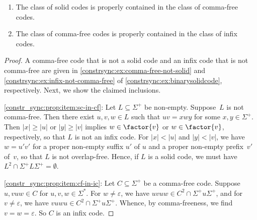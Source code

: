 \begin{proposition}
	\label{constr_sync:prop:selfsync_implies_avoiding}
	\begin{enumerate} 
		\item \label{constr_sync:prop:item:sc-in-cf} The class of solid codes is properly contained in the 
		class of comma-free codes. 
		
		\item \label{constr_sync:prop:item:cf-in-ic} The class of comma-free codes is properly contained in the class of infix codes.
	\end{enumerate} 	
\end{proposition}
\begin{proof}
	A comma-free code that is not a solid code
	and an infix code that is not comma-free
	are given in \cref{constrsync:ex:comma-free-not-solid} and \cref{constrsync:ex:infix-not-comma-free} 
	of \cref{constrsync:ex:binarysolidcode}, respectively.
	Next, we show the claimed inclusions.	
		
	\ref{constr_sync:prop:item:sc-in-cf}:
	Let $L \subseteq \Sigma^+$ be non-empty. Suppose~$L$ is not comma-free.
	Then there exist $u,v,w \in L$ such that
    $uv = xwy$ for some $x,y \in \Sigma^+$.
	Then $|x| \ge |u|$ or $|y| \ge |v|$ 
	implies $w \in \factor{v}$ or $w \in \factor{v}$, respectively, so that $L$
	is not an infix code.
	For $|x| < |u|$ and $|y| < |v|$, we have 
	$w = u'v'$ for a proper non-empty suffix $u'$ of $u$
	and a proper non-empty prefix~$v'$ of~$v$,
	so that $L$ is not overlap-free.
	Hence, if $L$ is a solid code, we must have $L^2 \cap \Sigma^+L\Sigma^+ = \emptyset$.
	
	\ref{constr_sync:prop:item:cf-in-ic}: Let $C \subseteq \Sigma^+$ be a comma-free code.
	Suppose $u, vuw \in C$ for $u,v,w \in \Sigma^*$.
	For $w \ne \varepsilon$, we have $uvuw \in C^2 \cap \Sigma^+ u \Sigma^+$,
	and for $v \ne \varepsilon$, we have $vuwu \in C^2 \cap \Sigma^+u \Sigma^+$.
	Whence, by comma-freeness, we find $v = w = \varepsilon$. So $C$ is an infix code.
\end{proof}

